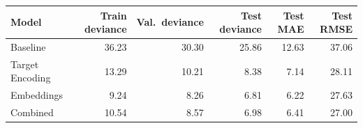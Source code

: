 \begin{tabular}{lrrrrr}
\toprule
Model & Train deviance & Val.\ deviance & Test deviance & Test MAE & Test RMSE \\
\midrule
Baseline & 36.23 & 30.30 & 25.86 & 12.63 & 37.06 \\
Target Encoding & 13.29 & 10.21 & 8.38 & 7.14 & 28.11 \\
Embeddings & 9.24 & 8.26 & 6.81 & 6.22 & 27.63 \\
Combined & 10.54 & 8.57 & 6.98 & 6.41 & 27.00 \\
\bottomrule
\end{tabular}

